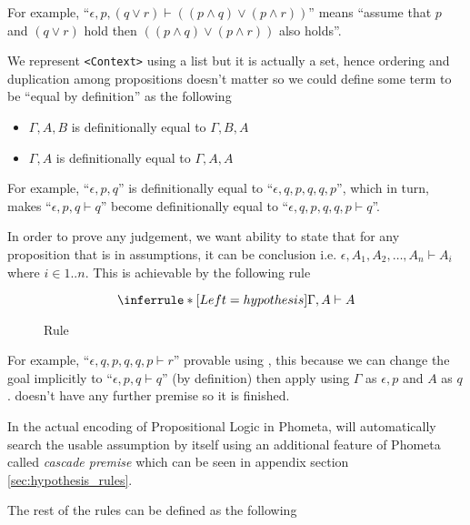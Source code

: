 \documentclass[master.tex]{subfiles}
\begin{document}
For example, ``$\epsilon, p, (q \vee r) \vdash ((p \wedge q) \vee (p \wedge
r))$'' means ``assume that $p$ and $(q \vee r)$ hold then $((p \wedge q) \vee (p
\wedge r))$ also holds''.

We represent \texttt{<Context>} using a list but it is actually a set, hence
ordering and duplication among propositions doesn't matter so we could define
some term to be ``equal by definition'' as the following
\begin{itemize}
\item $\Gamma, A, B$ is definitionally equal to $\Gamma, B, A$
\item $\Gamma, A$ is definitionally equal to $\Gamma, A, A$
\end{itemize}
For example, ``$\epsilon, p, q$'' is definitionally equal to ``$\epsilon, q, p,
q, q, p$'', which in turn, makes ``$\epsilon, p, q \vdash q$'' become
definitionally equal to ``$\epsilon, q, p, q, q, p \vdash q$''.

In order to prove any judgement, we want ability to state that for any
proposition that is in assumptions, it can be conclusion i.e. $\epsilon, A_1,
A_2, \ldots, A_n \vdash A_i$ where $i \in {1..n}$. This is achievable by the
following rule

\begin{figure}[H]
\begin{framed}
\centering
$$
\derivRule{hypothesis}{\Gamma, A \vdash A}{ }
$$
\end{framed}
\caption{Rule }
\end{figure}

For example, ``$\epsilon, q, p, q, q, p \vdash r$'' provable using
, this because we can change the goal implicitly to
``$\epsilon, p, q \vdash q$'' (by definition) then apply 
using $\Gamma$ as $\epsilon, p$ and $A$ as $q$.  doesn't
have any further premise so it is finished.

In the actual encoding of Propositional Logic in Phometa, 
will automatically search the usable assumption by itself using an additional
feature of Phometa called \emph{cascade premise} which can be seen in appendix
section \ref{sec:hypothesis_rules}.

\newpage

The rest of the rules can be defined as the following
\end{document}
